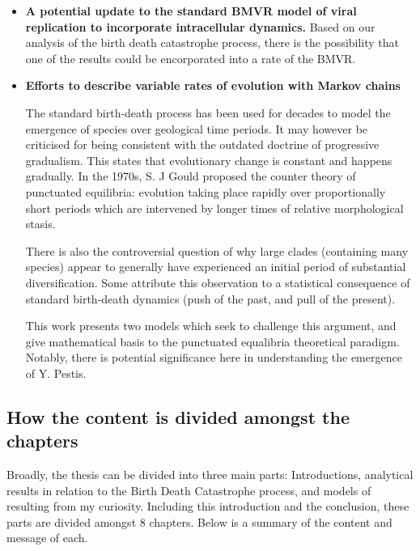 \begin{itemize}
\item \textbf{A potential update to the standard BMVR model of viral replication to incorporate intracellular dynamics.}
Based on our analysis of the birth death catastrophe process, there is the possibility that one of the results could be encorporated into a rate of the BMVR.

\item \textbf{Efforts to describe variable rates of evolution with Markov chains}\par
The standard birth-death process has been used for decades to model the emergence of species over geological time periods. It may however be criticised for being consistent with the outdated doctrine of progressive gradualism. This states that evolutionary change is constant and happens gradually. In the 1970s,  S. J Gould proposed the counter theory of punctuated equilibria: evolution taking place rapidly over proportionally short periods which are intervened by longer times of relative morphological stasis.\par
There is also the controversial question of why large clades (containing many species) appear to generally have experienced an initial period of substantial diversification. Some attribute this observation to a statistical consequence of standard birth-death dynamics (push of the past, and pull of the present).\par
This work presents two models which seek to challenge this argument, and give mathematical basis to the punctuated equalibria theoretical paradigm. Notably, there is potential significance here in understanding the emergence of Y. Pestis.


\end{itemize}











\subsection{How the content is divided amongst the chapters}

Broadly, the thesis can be divided into three main parts: Introductions,  analytical results in relation to the Birth Death Catastrophe process,  and models of resulting from my curiosity.  Including this introduction and the conclusion,  these parts are divided amongst 8 chapters.  Below is a summary of the content and message of each.













